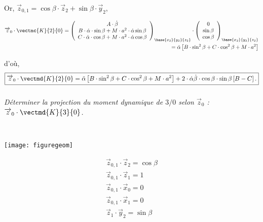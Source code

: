 \begin{multicols}{2}
\begin{corrige}
Or, $\overrightarrow{z}_{0,1}=\cos\beta\cdot \overrightarrow{z}_2+\sin\beta\cdot \overrightarrow{y}_2$,

\begin{align*}
\overrightarrow{z}_0\cdot\vectmc{K}{2}{0}=
\left(
\begin{array}{c}
A\cdot \dot{\beta}\\
B\cdot \dot{\alpha}\cdot \sin\beta+M\cdot a^2\cdot \dot{\alpha}\sin\beta\\
C\cdot \dot{\alpha}\cdot \cos\beta+M\cdot a^2\cdot \dot{\alpha}\cos\beta\\
\end{array}
\right)_{\base{{x}_2}{{y}_2}{{z}_2}}
\cdot
\left(
\begin{array}{c}
0\\
\sin\beta\\
\cos\beta\\
\end{array}
\right)_{\base{{x}_2}{{y}_2}{{z}_2}}
\\
=\dot{\alpha}\left[B\cdot \sin^2\beta+C\cdot \cos^2\beta+M\cdot a^2\right]
\end{align*}

d'où,
\begin{align*}
\boxed{
\overrightarrow{z}_0\cdot \vectmd{K}{2}{0}=\ddot{\alpha}\left[B\cdot \sin^2\beta+C\cdot \cos^2\beta+M\cdot a^2\right]
+2\cdot\dot{\alpha}\dot{\beta}\cdot \cos\beta\cdot \sin\beta\left[B-C\right].
}
\end{align*}
\end{corrige}
\else
\fi


\subparagraph{} \textit{Déterminer la projection du moment dynamique de $3/0$ selon $\overrightarrow{z}_0$ : $\overrightarrow{z}_0\cdot \vectmd{K}{3}{0}$.}

\ifprof
\begin{corrige} ~\\

\begin{minipage}{0.5\textwidth}
\begin{center}
\texttt{[image: figuregeom]}
\end{center}
\end{minipage}
\begin{minipage}{0.5\textwidth}
\begin{align*}
\overrightarrow{z}_{0,1}\cdot \overrightarrow{z}_2=\cos\beta\\
\overrightarrow{z}_{0,1}\cdot \overrightarrow{z}_1=1\\
\overrightarrow{z}_{0,1}\cdot \overrightarrow{x}_0=0\\
\overrightarrow{z}_{0,1}\cdot \overrightarrow{x}_1=0\\
\overrightarrow{z}_1\cdot \overrightarrow{y}_2=\sin\beta\\
\end{align*}
\end{minipage}


\end{corrige}
\end{multicols}
